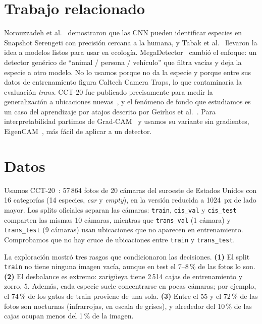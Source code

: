 \documentclass{article}
\begin{document}
\section{Trabajo relacionado}
\label{sec:relacionado}

Norouzzadeh et al.~\cite{norouzzadeh2018} demostraron que las CNN pueden
identificar especies en Snapshot Serengeti con precisión cercana a la humana,
y Tabak et al.~\cite{tabak2019} llevaron la idea a modelos listos para usar en
ecología. MegaDetector~\cite{beery2019megadetector} cambió el enfoque: un
detector genérico de ``animal / persona / vehículo'' que filtra vacías y deja
la especie a otro modelo. No lo usamos porque no da la especie y porque entre
sus datos de entrenamiento figura Caltech Camera Traps, lo que contaminaría la
evaluación \emph{trans}. CCT-20 fue publicado precisamente para medir la
generalización a ubicaciones nuevas~\cite{beery2018terra}, y el fenómeno de
fondo que estudiamos es un caso del aprendizaje por atajos descrito por
Geirhos et al.~\cite{geirhos2020shortcut}. Para interpretabilidad partimos de
Grad-CAM~\cite{selvaraju2017gradcam} y usamos su variante sin gradientes,
EigenCAM~\cite{muhammad2020eigencam}, más fácil de aplicar a un detector.

\section{Datos}
\label{sec:datos}

Usamos CCT-20~\cite{beery2018terra}: 57\,864 fotos de 20 cámaras del suroeste
de Estados Unidos con 16 categorías (14 especies, \emph{car} y \emph{empty}),
en la versión reducida a 1024~px de lado mayor. Los splits oficiales separan
las cámaras: \texttt{train}, \texttt{cis\_val} y \texttt{cis\_test} comparten
las mismas 10 cámaras, mientras que \texttt{trans\_val} (1 cámara) y
\texttt{trans\_test} (9 cámaras) usan ubicaciones que no aparecen en
entrenamiento. Comprobamos que no hay cruce de ubicaciones entre
\texttt{train} y \texttt{trans\_test}.

La exploración mostró tres rasgos que condicionaron las decisiones.
\textbf{(1)} El split \texttt{train} no tiene ninguna imagen vacía, aunque en
test el 7--8\,\% de las fotos lo son. \textbf{(2)} El desbalance es extremo:
zarigüeya tiene 2\,514 cajas de entrenamiento y zorro, 5. Además, cada especie
suele concentrarse en pocas cámaras; por ejemplo, el 74\,\% de los gatos de
train proviene de una sola. \textbf{(3)} Entre el 55 y el 72\,\% de las fotos
son nocturnas (infrarrojas, en escala de grises), y alrededor del 10\,\% de las
cajas ocupan menos del 1\,\% de la imagen.
\end{document}
